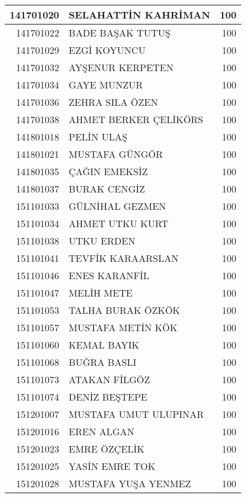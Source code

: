 \documentclass[12pt]{article}
\begin{document}
\begin{longtable}{||r||l||r||}
    \midrule
    141701020 & SELAHATTİN KAHRİMAN & 100 \\
    \midrule
    141701022 & BADE BAŞAK TUTUŞ & 100 \\
    \midrule
    141701029 & EZGİ KOYUNCU & 100 \\
    \midrule
    141701032 & AYŞENUR KERPETEN & 100 \\
    \midrule
    141701034 & GAYE MUNZUR & 100 \\
    \midrule
    141701036 & ZEHRA SILA ÖZEN & 100 \\
    \midrule
    141701038 & AHMET BERKER ÇELİKÖRS & 100 \\
    \midrule
    141801018 & PELİN ULAŞ & 100 \\
    \midrule
    141801021 & MUSTAFA GÜNGÖR & 100 \\
    \midrule
    141801035 & ÇAĞIN EMEKSİZ & 100 \\
    \midrule
    141801037 & BURAK CENGİZ & 100 \\
    \midrule
    151101033 & GÜLNİHAL GEZMEN & 100 \\
    \midrule
    151101034 & AHMET UTKU KURT & 100 \\
    \midrule
    151101038 & UTKU ERDEN & 100 \\
    \midrule
    151101041 & TEVFİK KARAARSLAN & 100 \\
    \midrule
    151101046 & ENES KARANFİL & 100 \\
    \midrule
    151101047 & MELİH METE & 100 \\
    \midrule
    151101053 & TALHA BURAK ÖZKÖK & 100 \\
    \midrule
    151101057 & MUSTAFA METİN KÖK & 100 \\
    \midrule
    151101060 & KEMAL BAYIK & 100 \\
    \midrule
    151101068 & BUĞRA BASLI & 100 \\
    \midrule
    151101073 & ATAKAN FİLGÖZ & 100 \\
    \midrule
    151101074 & DENİZ BEŞTEPE & 100 \\
    \midrule
    151201007 & MUSTAFA UMUT ULUPINAR & 100 \\
    \midrule
    151201016 & EREN ALGAN & 100 \\
    \midrule
    151201023 & EMRE ÖZÇELİK & 100 \\
    \midrule
    151201025 & YASİN EMRE TOK & 100 \\
    \midrule
    151201028 & MUSTAFA YUŞA YENMEZ & 100 \\

\end{longtable}
\end{document}
